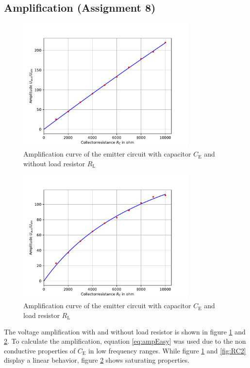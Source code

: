 \documentclass[11pt, a4paper]{article}
\begin{document}
\subsection{Amplification (Assignment 8)}
\begin{figure}[h]
    \centering
    \includegraphics[width=0.8\textwidth]{plots/RC1.pdf}
    \caption{Amplification curve of the emitter circuit with capacitor $C_{\text{E}}$ and without load resistor $R_{\text{L}}$}
    \label{fig:RC1}
\end{figure}

\begin{figure}[h]
    \centering
    \includegraphics[width=0.8\textwidth]{plots/RC3.pdf}
    \caption{Amplification curve of the emitter circuit with capacitor $C_{\text{E}}$ and load resistor $R_{\text{L}}$}
    \label{fig:RC3}
\end{figure}
The voltage amplification with and without load resistor is shown in figure \ref{fig:RC1} and \ref{fig:RC3}. To calculate the amplification, equation \ref{eq:ampEasy} was used due to the non conductive properties of $C_{\text{E}}$ in low frequency ranges.
While figure \ref{fig:RC1} and \ref{fig:RC2} display a linear behavior, figure \ref{fig:RC3} shows saturating properties.
\end{document}
